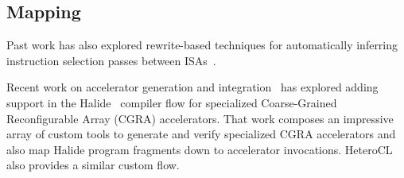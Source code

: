 \subsection{Mapping}


Past work has also explored rewrite-based techniques for
  automatically inferring instruction selection passes
  between ISAs~\cite{ramsey2011resourceable}.
  
Recent work on accelerator generation and integration~\cite{
    bahr2020creating, truong2020fault}
  has explored adding support in the Halide~\cite{ragan2013halide}
  compiler flow for specialized Coarse-Grained Reconfigurable Array (CGRA) accelerators.
That work composes an
  impressive array of custom tools to
  generate and verify specialized CGRA accelerators
  and also map Halide program fragments
  down to accelerator invocations.
HeteroCL~\cite{lai2019heterocl} also provides
  a similar custom flow.
  

